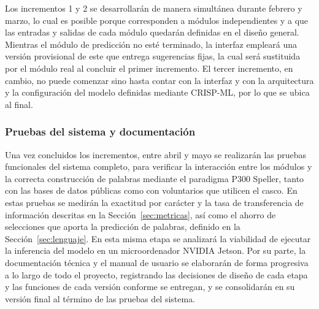 Los incrementos 1 y 2 se desarrollarán de manera simultánea durante febrero y marzo, lo cual es
posible porque corresponden a módulos independientes y a que las entradas y salidas de cada módulo
quedarán definidas en el diseño general. Mientras el módulo de predicción no esté terminado, la
interfaz empleará una versión provisional de este que entrega sugerencias fijas, la cual será
sustituida por el módulo real al concluir el primer incremento. El tercer incremento, en cambio,
no puede comenzar sino hasta contar con la interfaz y con la arquitectura y la configuración del
modelo definidas mediante CRISP-ML, por lo que se ubica al final.

\subsubsection{Pruebas del sistema y documentación}

Una vez concluidos los incrementos, entre abril y mayo se realizarán las pruebas funcionales del
sistema completo, para verificar la interacción entre los módulos y la correcta
construcción de palabras mediante el paradigma P300 Speller, tanto con las bases de datos públicas
como con voluntarios que utilicen el casco. En estas pruebas se medirán la exactitud por carácter y
la tasa de transferencia de información descritas en la Sección~\ref{sec:metricas}, así como el
ahorro de selecciones que aporta la predicción de palabras, definido en la
Sección~\ref{sec:lenguaje}. En esta misma etapa se analizará la
viabilidad de ejecutar la inferencia del modelo en un microordenador NVIDIA Jetson. Por su parte,
la documentación técnica y el manual de usuario se elaborarán de forma progresiva a lo largo de
todo el proyecto, registrando las decisiones de diseño de cada etapa y las funciones de cada
versión conforme se entregan, y se consolidarán en su versión final al término de las pruebas del
sistema.

